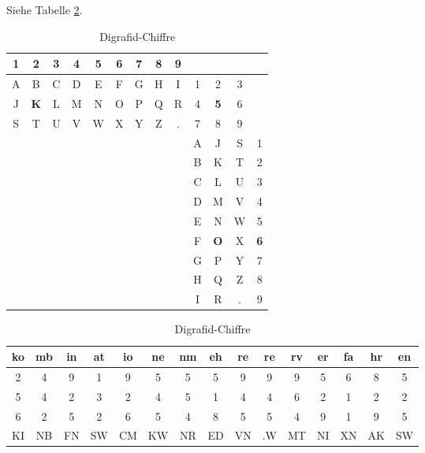 \begin{refsegment}
\begin{itemize}
   Siehe Tabelle \ref{Digrafid-table-reference}.

   \begin{table}[ht]

   \begin{center}
   \begin{tabular}{|ccccccccc|ccc|c|}
   \hline	
	1 & {\bf 2} & 3 & 4 & 5 & 6 & 7 & 8 & 9 &   &   &   &  \\
   \hline

	A & B & C & D & E & F & G & H & I & 1 & 2 & 3 &  \\
	J & {\bf K} & L & M & N & O & P & Q & R & 4 & {\bf 5} & 6 &  \\
	S & T & U & V & W & X & Y & Z & . & 7 & 8 & 9 &  \\
   \hline
	  &   &   &   &   &   &   &   &   & A & J & S & 1\\
	  &   &   &   &   &   &   &   &   & B & K & T & 2\\
	  &   &   &   &   &   &   &   &   & C & L & U & 3\\
	  &   &   &   &   &   &   &   &   & D & M & V & 4\\
	  &   &   &   &   &   &   &   &   & E & N & W & 5\\
	  &   &   &   &   &   &   &   &   & F & {\bf O} & X & {\bf 6}\\
	  &   &   &   &   &   &   &   &   & G & P & Y & 7\\
	  &   &   &   &   &   &   &   &   & H & Q & Z & 8\\
	  &   &   &   &   &   &   &   &   & I & R & . & 9\\
   \hline
   \end{tabular}
   \end{center}

   \begin{center}
   \begin{tabular}{|c@{ }c@{ }c|c@{ }c@{ }c|c@{ }c@{ }c|c@{ }c@{ }c|c@{ }c@{ }c|}
   \hline		
	ko & mb & in & at & io & ne & nm & eh & re & re & rv & er & fa & hr & en\\
   \hline
	2  & 4  & 9  & 1  & 9  & 5  & 5  & 5  & 9  & 9  & 9  & 5  & 6  & 8  & 5\\
	5  & 4  & 2  & 3  & 2  & 4  & 5  & 1  & 4  & 4  & 6  & 2  & 1  & 2  & 2\\
	6  & 2  & 5  & 2  & 6  & 5  & 4  & 8  & 5  & 5  & 4  & 9  & 1  & 9  & 5\\
   \hline
	KI & NB & FN & SW & CM & KW	& NR & ED & VN & .W & MT & NI & XN & AK & SW\\
   \hline
   \end{tabular}
   \caption{Digrafid-Chiffre}
   \label{Digrafid-table-reference}
   \end{center}


\end{table}
\end{itemize}
\end{refsegment}
